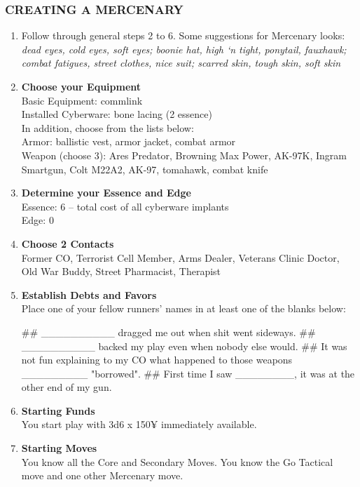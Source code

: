 \subsubsection{CREATING A MERCENARY}
\begin{enumerate}
    \item Follow through general steps 2 to 6. Some suggestions for Mercenary looks: \textit{dead eyes, cold eyes, soft eyes; boonie hat, high ‘n tight, ponytail, fauxhawk; combat fatigues, street clothes, nice suit; scarred skin, tough skin, soft skin}
    
    \item \textbf{Choose your Equipment} \\
    Basic Equipment: commlink \\
    Installed Cyberware: bone lacing (2 essence) \\
    In addition, choose from the lists below: \\
    Armor: ballistic vest, armor jacket, combat armor \\
    Weapon (choose 3): Ares Predator, Browning Max Power, AK-97K, Ingram Smartgun, Colt M22A2, AK-97, tomahawk, combat knife
    
    \item \textbf{Determine your Essence and Edge} \\
    Essence: 6 – total cost of all cyberware implants \\ Edge: 0
    
    \item \textbf{Choose 2 Contacts} \\
    Former CO, Terrorist Cell Member, Arms Dealer, Veterans Clinic Doctor, Old War Buddy, Street Pharmacist, Therapist
    
    \item \textbf{Establish Debts and Favors} \\
    Place one of your fellow runners’ names in at least one of the blanks below:
        \begin{easylist}
            ## \_\_\_\_\_\_\_\_\_\_ dragged me out when shit went sideways.
            ## \_\_\_\_\_\_\_\_\_\_ backed my play even when nobody else would.
            ## It was not fun explaining to my CO what happened to those weapons \_\_\_\_\_\_\_\_\_ "borrowed".
            ## First time I saw \_\_\_\_\_\_\_\_, it was at the other end of my gun.
        \end{easylist}
    
    \item \textbf{Starting Funds} \\
    You start play with 3d6 x 150¥ immediately available.
    
    \item \textbf{Starting Moves} \\
    You know all the Core and Secondary Moves. You know the Go Tactical move and one other Mercenary move.
\end{enumerate}


